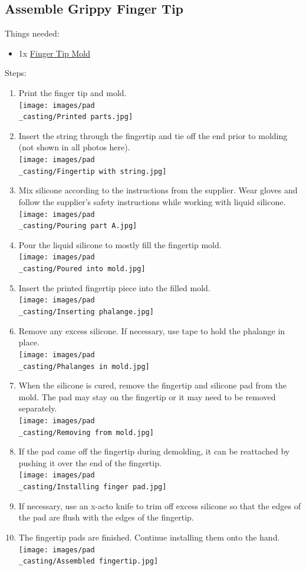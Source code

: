 \documentclass[11pt]{article}
\begin{document}
\subsection{Assemble Grippy Finger Tip}
Things needed:
\begin{itemize}
\item 1x \hyperlink{thing_finger\_tip\_mold}{Finger Tip Mold}
\end{itemize}
Steps:
\begin{enumerate}
\item Print the finger tip and mold.\\ \texttt{[image: images/pad\\\_casting/Printed parts.jpg]}
\item Insert the string through the fingertip and tie off the end prior to molding (not shown in all photos here).\\ \texttt{[image: images/pad\\\_casting/Fingertip with string.jpg]}
\item Mix silicone according to the instructions from the supplier. Wear gloves and follow the supplier's safety instructions while working with liquid silicone.\\ \texttt{[image: images/pad\\\_casting/Pouring part A.jpg]}
\item Pour the liquid silicone to mostly fill the fingertip mold.\\ \texttt{[image: images/pad\\\_casting/Poured into mold.jpg]}
\item Insert the printed fingertip piece into the filled mold.\\ \texttt{[image: images/pad\\\_casting/Inserting phalange.jpg]}
\item Remove any excess silicone. If necessary, use tape to hold the phalange in place.\\ \texttt{[image: images/pad\\\_casting/Phalanges in mold.jpg]}
\item When the silicone is cured, remove the fingertip and silicone pad from the mold. The pad may stay on the fingertip or it may need to be removed separately.\\ \texttt{[image: images/pad\\\_casting/Removing from mold.jpg]}
\item If the pad came off the fingertip during demolding, it can be reattached by pushing it over the end of the fingertip.\\ \texttt{[image: images/pad\\\_casting/Installing finger pad.jpg]}
\item If necessary, use an x-acto knife to trim off excess silicone so that the edges of the pad are flush with the edges of the fingertip.
\item The fingertip pads are finished. Continue installing them onto the hand.\\ \texttt{[image: images/pad\\\_casting/Assembled fingertip.jpg]}
\end{enumerate}
\end{document}
